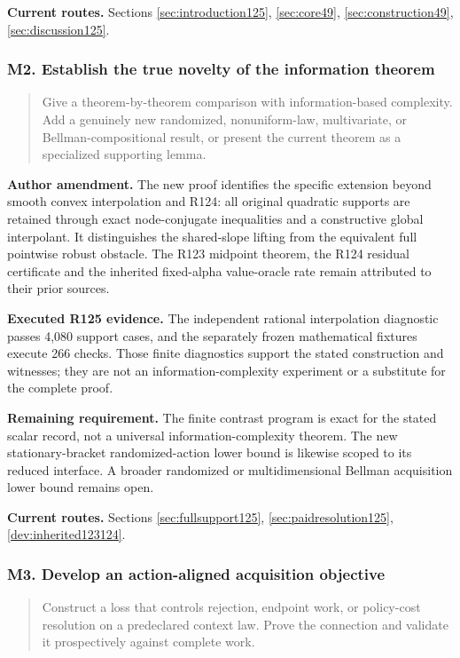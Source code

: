 \noindent\textbf{Current routes.} Sections \ref{sec:introduction125}, \ref{sec:core49}, \ref{sec:construction49}, \ref{sec:discussion125}.

\subsubsection{M2. Establish the true novelty of the information theorem}

\begin{quote}\small
Give a theorem-by-theorem comparison with information-based complexity. Add a genuinely new randomized, nonuniform-law, multivariate, or Bellman-compositional result, or present the current theorem as a specialized supporting lemma.
\end{quote}

\noindent\textbf{Author amendment.} The new proof identifies the specific extension beyond smooth convex interpolation and R124: all original quadratic supports are retained through exact node-conjugate inequalities and a constructive global interpolant. It distinguishes the shared-slope lifting from the equivalent full pointwise robust obstacle. The R123 midpoint theorem, the R124 residual certificate and the inherited fixed-alpha value-oracle rate remain attributed to their prior sources.

\noindent\textbf{Executed R125 evidence.} The independent rational interpolation diagnostic passes 4,080 support cases, and the separately frozen mathematical fixtures execute 266 checks. Those finite diagnostics support the stated construction and witnesses; they are not an information-complexity experiment or a substitute for the complete proof.

\noindent\textbf{Remaining requirement.} The finite contrast program is exact for the stated scalar record, not a universal information-complexity theorem. The new stationary-bracket randomized-action lower bound is likewise scoped to its reduced interface. A broader randomized or multidimensional Bellman acquisition lower bound remains open.

\noindent\textbf{Current routes.} Sections \ref{sec:fullsupport125}, \ref{sec:paidresolution125}, \ref{dev:inherited123124}.

\subsubsection{M3. Develop an action-aligned acquisition objective}

\begin{quote}\small
Construct a loss that controls rejection, endpoint work, or policy-cost resolution on a predeclared context law. Prove the connection and validate it prospectively against complete work.
\end{quote}

